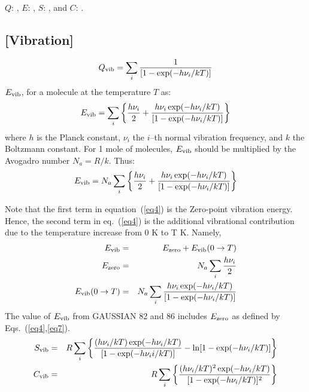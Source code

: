 $Q$: , $E$: , $S$: , 
and $C$: .

\subsection*{[Vibration]}
\begin{equation}
Q_{\rm vib} = \sum_i{\frac{1}{[1 - \exp(-h\nu_i/kT)]}} \label{eq2}
\end{equation}
$E_{\rm vib}$, for a molecule at the temperature $T$ as:
\begin{equation}
E_{\rm vib} = \sum_i\left\{\frac{h\nu_i}{2} + 
\frac{h\nu_i\exp(-h\nu_i/kT)}{[1 - \exp(-h\nu_i/kT)]}\right\}  \label{eq3}
\end{equation}
where $h$ is the Planck constant, $\nu_i$ the $i$--th normal 
vibration  frequency,
and $k$  the Boltzmann constant.  For 1 mole of molecules, $E_{\rm vib}$ 
should be multiplied by the Avogadro number $N_a = R/k$.  Thus:
\begin{equation}
E_{\rm vib} = N_a  \sum_i\left\{ \frac{h\nu_i}{2}
 + \frac{h\nu_i\exp(-h\nu_i/kT)}{[1-\exp(-h\nu_i/kT)]}\right\}  \label{eq4}
\end{equation}

Note that the first term  in equation~(\ref{eq4})  is  
the  Zero-point  vibration energy.   Hence,  the second term 
in eq.~(\ref{eq4}) is the additional vibrational
   contribution due to the temperature increase from 0 K to T K.  Namely,
\begin{eqnarray}
E_{\rm vib}                & = & E_{\rm zero} + E_{\rm vib}(0\rightarrow T)
\label{eq5}\\
E_{\rm zero}               & = & N_a \sum_i {\frac{h\nu_i}{2}} \label{eq6}\\
E_{\rm vib}(0\rightarrow T) & = & N_a  \sum_i 
{\frac{h\nu_i\exp(-h\nu_i/kT)}{[1 - \exp(-h\nu_i/kT)]}} \label{eq7}
\end{eqnarray}                                         
The value of $E_{\rm vib}$ from GAUSSIAN 82 and 86 includes 
$E_{\rm zero}$ as defined by Eqs.~(\ref{eq4},\ref{eq7}).
\begin{eqnarray}
S_{\rm vib} & = & R \sum_i\left\{
\frac{(h\nu_i/kT)\exp(-h\nu_i/kT)}{[1 - \exp(-h\nu_ii/kT)]}
- \ln[1 - \exp(-h\nu_i/kT)]\right\} \label{eq8}\\
C_{\rm vib} & = & R \sum_i\left\{
\frac{(h\nu_i/kT)^2 \exp(-h\nu_i/kT)}{[1 - \exp(-h\nu_i/kT)]^2}\right\} 
\label{eq9}
\end{eqnarray}

